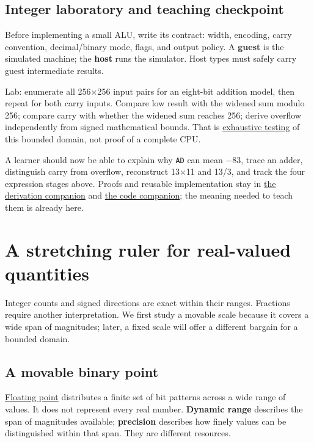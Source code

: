 \subsection{Integer laboratory and teaching checkpoint}\label{01-foundations-i-ch001-integer-laboratory-and-teaching-checkpoint}

Before implementing a small ALU, write its contract: width, encoding, carry convention, decimal/binary mode, flags, and output policy. A \textbf{guest} is the simulated machine; the \textbf{host} runs the simulator. Host types must safely carry guest intermediate results.

Lab: enumerate all 256×256 input pairs for an eight-bit addition model, then repeat for both carry inputs. Compare low result with the widened sum modulo 256; compare carry with whether the widened sum reaches 256; derive overflow independently from signed mathematical bounds. That is \hyperref[appendix-05db24ccc28a]{exhaustive testing} of this bounded domain, not proof of a complete CPU.

A learner should now be able to explain why \texttt{AD} can mean −83, trace an adder, distinguish carry from overflow, reconstruct 13×11 and 13/3, and track the four expression stages above. Proofs and reusable implementation stay in \hyperref[01-foundations-i-ch011-m002---signed-representations-adders-and-arithmetic-policies]{the derivation companion} and \hyperref[appendix-4e2236f53445-m002---exhaustive-8-bit-addition-oracle-and-saturation]{the code companion}; the meaning needed to teach them is already here.

\section{A stretching ruler for real-valued quantities}\label{01-foundations-i-ch001-a-stretching-ruler-for-real-valued-quantities}

Integer counts and signed directions are exact within their ranges. Fractions require another interpretation. We first study a movable scale because it covers a wide span of magnitudes; later, a fixed scale will offer a different bargain for a bounded domain.

\subsection{A movable binary point}\label{01-foundations-i-ch001-a-movable-binary-point}

\hyperref[appendix-343615f49ddf]{Floating point} distributes a finite set of bit patterns across a wide range of values. It does not represent every real number. \textbf{Dynamic range} describes the span of magnitudes available; \textbf{precision} describes how finely values can be distinguished within that span. They are different resources.

